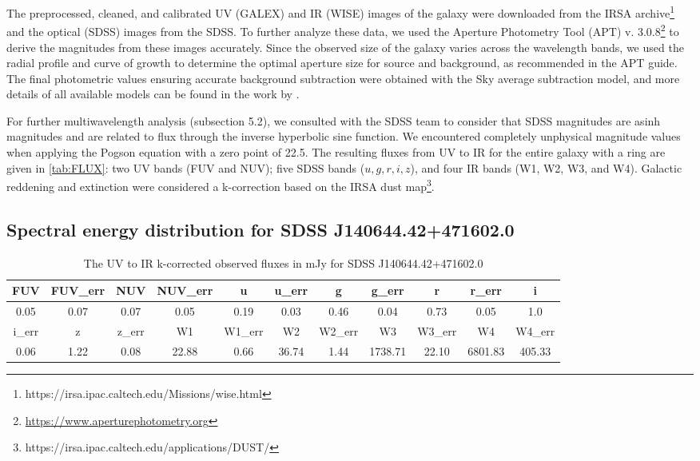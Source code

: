 \documentclass{aa}
\begin{document}
The preprocessed, cleaned, and calibrated UV (GALEX) and IR (WISE) images of the galaxy were downloaded from the IRSA archive\footnote{https://irsa.ipac.caltech.edu/Missions/wise.html} and the optical (SDSS) images from the SDSS. To further analyze these data, we used the Aperture Photometry Tool (APT) v. 3.0.8\footnote{\url{https://www.aperturephotometry.org}} \cite{Laher2012} to derive the magnitudes from these images accurately. Since the observed size of the galaxy varies across the wavelength bands, we used the radial profile and curve of growth to determine the optimal aperture size for source and background, as recommended in the APT guide. The final photometric values ensuring accurate background subtraction were obtained with the Sky average subtraction model, and more details of all available models can be found in the work by \cite{Laher2012}. 

For further multiwavelength analysis (subsection 5.2), we consulted with the SDSS team to consider that SDSS magnitudes are asinh magnitudes and are related to flux through the inverse hyperbolic sine function. We encountered completely unphysical magnitude values when applying the Pogson equation with a zero point of 22.5. The resulting fluxes from UV to IR for the entire galaxy with a ring are given in \autoref{tab:FLUX}: two UV bands (FUV and NUV); five SDSS bands ($u,g,r,i,z$), and four IR bands (W1, W2, W3, and W4).  Galactic reddening and extinction were considered a k-correction based on the IRSA dust map\footnote{https://irsa.ipac.caltech.edu/applications/DUST/}. 

\subsection{Spectral energy distribution for SDSS J140644.42+471602.0}

\begin{table}[h!]
    \centering
     \caption{The UV to IR k-corrected observed fluxes in mJy for SDSS J140644.42+471602.0}
\begin{tabular}{|c|c|c|c|c|c|c|c|c|c|c|}
\hline
  FUV & FUV\_err & NUV & NUV\_err & u & u\_err & g & g\_err & r & r\_err & i \\
\hline
  0.05 & 0.07 & 0.07 & 0.05 & 0.19 & 0.03 & 0.46 & 0.04 & 0.73 & 0.05 & 1.0 \\
\hline
  i\_err & z & z\_err & W1 & W1\_err & W2 & W2\_err & W3 & W3\_err & W4 & W4\_err \\
\hline
  0.06 & 1.22 & 0.08 & 22.88 & 0.66 & 36.74 & 1.44 & 1738.71 & 22.10 & 6801.83 & 405.33 \\
\hline
\end{tabular}
    \label{tab:FLUX}
\end{table}
\end{document}
